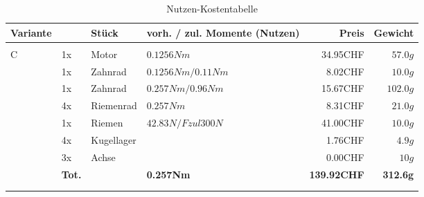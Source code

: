 \begin{longtable}{p{0.5cm}p{0.8cm}lp{3cm}rr}
        \newpage
        \textbf{Variante}& & \textbf{Stück} & \textbf{vorh. / zul. Momente (Nutzen)} & \textbf{Preis} & \textbf{Gewicht} \\\hline
          &       &                 &                      &          &  \\
        \multirow{8}[2]{*}{C} 
          & 1x    & Motor           & $0.1256 Nm$          & 34.95CHF & $57.0 g$ \\
          & 1x    & Zahnrad         & $0.1256 Nm / 0.11 Nm$& 8.02CHF  & $10.0 g$ \\
          & 1x    & Zahnrad         & $0.257 Nm / 0.96 Nm$ & 15.67CHF & $102.0 g$ \\
          & 4x    & Riemenrad       & $0.257 Nm$           & 8.31CHF  & $21.0 g$ \\
          & 1x    & Riemen          & $42.83 N /Fzul 300 N $ & 41.00CHF & $10.0 g$ \\
          & 4x    & Kugellager      &                      & 1.76CHF  & $4.9 g$ \\
          & 3x    & Achse           &                      & 0.00CHF  & $10 g$ \\
          & \textbf{Tot.} &       & \textbf{0.257Nm} & \textbf{139.92CHF} & \textbf{312.6g} \\
          &       &                 &                      &          &  \\
      \caption{Nutzen-Kostentabelle}       
      \label{tab:addlabel}
    \end{longtable}